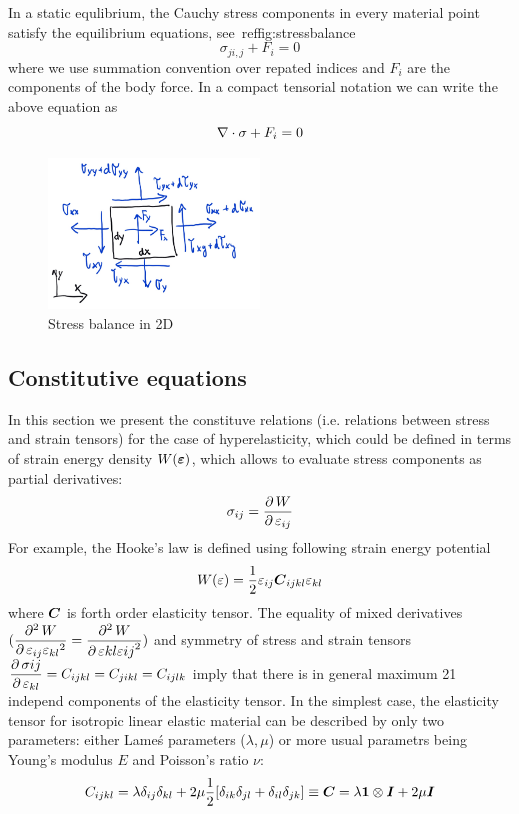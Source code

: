 In a static equlibrium, the Cauchy stress components in every material point satisfy the equilibrium equations, see~ref{fig:stressbalance}
\begin{equation}
  \sigma_{ji, j} + F_i = 0
\end{equation}
where we use summation convention over repated indices and $F_i$ are the components of the body force. In a compact tensorial notation we can write the above equation as
\begin{equation}
  \nabla\cdot\sigma + F_i = 0
  \label{eq:staticequlibrium3d}
\end{equation}

\begin{figure}
  \begin{center}
    \includegraphics[width=0.5\textwidth]{figs/stressbalance2d.png}
  \end{center}
  \label{fig:stressbalance}
  \caption{Stress balance in 2D}
\end{figure}

\subsection{Constitutive equations}
In this section we present the constituve relations (i.e. relations between stress and strain tensors) for the case of hyperelasticity, which could be defined in terms of strain energy density $W(\mbox{\boldmath$\varepsilon$})$, which allows to evaluate stress components as partial derivatives:
$$
\sigma_{ij}=\mbox{$\displaystyle\frac{\partial \,{W}}{\partial \,{\varepsilon_{ij}}}$}
$$
For example, the Hooke's law  is defined using following strain energy potential
$$
W(\varepsilon) = \mbox{$\displaystyle\frac{1}{2}$}\varepsilon_{ij}\mbox{\boldmath$C$}_{ijkl}\varepsilon_{kl}
$$
where $\mbox{\boldmath$C$}$ is forth order elasticity tensor. The equality of mixed derivatives $(\mbox{$\displaystyle\frac{\partial ^{2}\,{W}}{\partial \,{\varepsilon_{ij}\varepsilon_{kl}}^{2}}$} = \mbox{$\displaystyle\frac{\partial ^{2}\,{W}}{\partial \,{\varepsilon{kl}\varepsilon{ij}}^{2}}$})$ and symmetry of stress and strain tensors $\mbox{$\displaystyle\frac{\partial \,{\sigma{ij}}}{\partial \,{\varepsilon_{kl}}}$} = C_{ijkl}=C_{jikl}=C_{ijlk}$ imply that there is in general maximum 21 independ components of the elasticity tensor.
In the simplest case, the elasticity tensor for isotropic linear elastic material  can be described by only two parameters: either Lame\'s parameters ($\lambda, \mu$) or more usual parametrs being Young's modulus $E$ and Poisson's ratio $\nu$:
$$
C_{ijkl}=\lambda\delta_{ij}\delta_{kl}+2\mu {1\over 2}[\delta_{ik}\delta_{jl}+
 \delta_{il}\delta_{jk}] \equiv \mbox{\boldmath$C$}=\lambda\mbox{\boldmath$1$}\otimes\mbox{\boldmath$I$}+2\mu\mbox{\boldmath$I$}
$$

